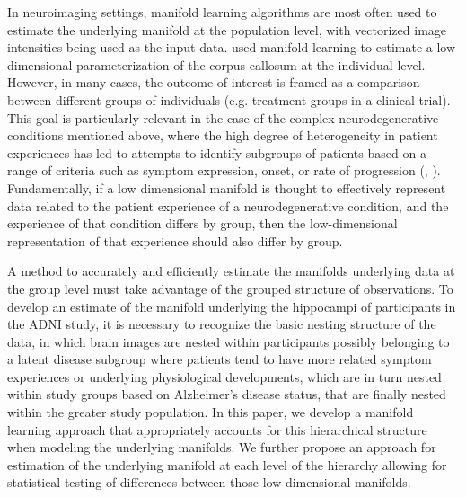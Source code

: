 \documentclass[11pt,reqno]{article}
\theoremstyle{definition}
\begin{document}
In neuroimaging settings, manifold learning algorithms are most often used to estimate the underlying manifold at the population level, with vectorized image intensities being used as the input data. \cite{yueParameterizationWhiteMatter2016} used manifold learning to estimate a low-dimensional parameterization of the corpus callosum at the individual level. However, in many cases, the outcome of interest is framed as a comparison between different groups of individuals (e.g. treatment groups in a clinical trial). This goal is particularly relevant in the case of the complex neurodegenerative conditions mentioned above, where the high degree of heterogeneity in patient experiences has led to attempts to identify subgroups of patients based on a range of criteria such as symptom expression, onset, or rate of progression (\cite{ferreiraBiologicalSubtypesAlzheimer2020}, \cite{venutoPredictingAmbulatoryCapacity}). Fundamentally, if a low dimensional manifold is thought to effectively represent data related to the patient experience of a neurodegenerative condition, and the experience of that condition differs by group, then the low-dimensional representation of that experience should also differ by group.

A method to accurately and efficiently estimate the manifolds underlying data at the group level must take advantage of the grouped structure of observations. To develop an estimate of the manifold underlying the hippocampi of participants in the ADNI study, it is necessary to recognize the basic nesting structure of the data, in which brain images are nested within participants possibly belonging to a latent disease subgroup where patients tend to have more related symptom experiences or underlying physiological developments, which are in turn nested within study groups based on Alzheimer's disease status, that are finally nested within the greater study population. In this paper, we develop a manifold learning approach that appropriately accounts for this hierarchical structure when modeling the underlying manifolds. We further propose an approach for estimation of the underlying manifold at each level of the hierarchy allowing for statistical testing of differences between those low-dimensional manifolds.
\end{document}
